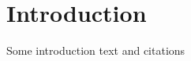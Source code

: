 \chapter{Introduction}
\label{ch:introduction}
\begin{refsection}[introduction]

Some introduction text and citations \cite{Williams2022, Brito2022}


\FloatBarrier
\printbibliography[heading=subbibnumbered, title={Bibliography}]
\end{refsection}
